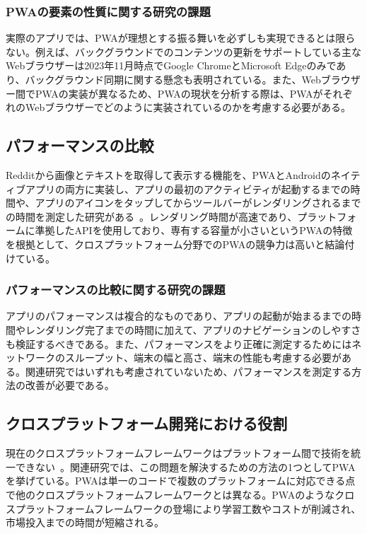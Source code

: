 \subsubsection{PWAの要素の性質に関する研究の課題}
\label{subsubsection:PWAの要素の性質に関する研究の課題}
実際のアプリでは、PWAが理想とする振る舞いを必ずしも実現できるとは限らない。例えば、バックグラウンドでのコンテンツの更新をサポートしている主なWebブラウザーは2023年11月時点でGoogle ChromeとMicrosoft Edgeのみであり、バックグラウンド同期に関する懸念も表明されている。また、Webブラウザー間でPWAの実装が異なるため、PWAの現状を分析する際は、PWAがそれぞれのWebブラウザーでどのように実装されているのかを考慮する必要がある。
\subsection{パフォーマンスの比較}
\label{subsection:パフォーマンスの比較}
Redditから画像とテキストを取得して表示する機能を、PWAとAndroidのネイティブアプリの両方に実装し、アプリの最初のアクティビティが起動するまでの時間や、アプリのアイコンをタップしてからツールバーがレンダリングされるまでの時間を測定した研究がある~\cite{Andreas2018ProgressiveWebApps}。レンダリング時間が高速であり、プラットフォームに準拠したAPIを使用しており、専有する容量が小さいというPWAの特徴を根拠として、クロスプラットフォーム分野でのPWAの競争力は高いと結論付けている。
\subsubsection{パフォーマンスの比較に関する研究の課題}
\label{subsubsection:パフォーマンスの比較に関する研究の課題}
アプリのパフォーマンスは複合的なものであり、アプリの起動が始まるまでの時間やレンダリング完了までの時間に加えて、アプリのナビゲーションのしやすさも検証するべきである。また、パフォーマンスをより正確に測定するためにはネットワークのスループット、端末の幅と高さ、端末の性能も考慮する必要がある。関連研究ではいずれも考慮されていないため、パフォーマンスを測定する方法の改善が必要である。
\subsection{クロスプラットフォーム開発における役割}
\label{subsection:クロスプラットフォーム開発における役割}
現在のクロスプラットフォームフレームワークはプラットフォーム間で技術を統一できない~\cite{Majchrzak2018ProgressiveWebApps}。関連研究では、この問題を解決するための方法の1つとしてPWAを挙げている。PWAは単一のコードで複数のプラットフォームに対応できる点で他のクロスプラットフォームフレームワークとは異なる。PWAのようなクロスプラットフォームフレームワークの登場により学習工数やコストが削減され、市場投入までの時間が短縮される。
